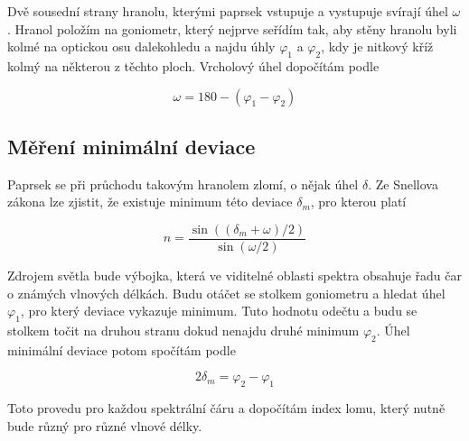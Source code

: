 \documentclass[a4paper,11pt]{article}
\begin{document}
Dvě sousední strany hranolu, kterými paprsek vstupuje a vystupuje svírají úhel $ \omega $. Hranol položím na goniometr, který nejprve seřídím tak, aby stěny hranolu byli kolmé na optickou osu dalekohledu a najdu úhly $ \varphi_1 $ a $ \varphi_2 $, kdy je nitkový kříž kolmý na některou z těchto ploch. Vrcholový úhel dopočítám podle

\begin{equation}
\omega = 180 - (\varphi_1 - \varphi_2) 
\end{equation}

\subsection{Měření minimální deviace}

Paprsek se při průchodu takovým hranolem zlomí, o nějak úhel $ \delta $. Ze Snellova zákona lze zjistit, že existuje minimum této deviace $ \delta_m $, pro kterou platí

\begin{equation}
    n = \frac{\sin ((\delta_m + \omega) / 2)}{\sin (\omega / 2)}
\end{equation}

Zdrojem světla bude výbojka, která ve viditelné oblasti spektra obsahuje řadu čar o známých vlnových délkách. Budu otáčet se stolkem goniometru a hledat úhel $ \varphi_1 $, pro který deviace vykazuje minimum. Tuto hodnotu odečtu a budu se stolkem točit na druhou stranu dokud nenajdu druhé minimum $ \varphi_2 $. Úhel minimální deviace potom spočítám podle

\begin{equation}
2 \delta_m = \varphi_2 - \varphi_1
\end{equation}

Toto provedu pro každou spektrální čáru a dopočítám index lomu, který nutně bude různý pro různé vlnové délky. 
\end{document}
